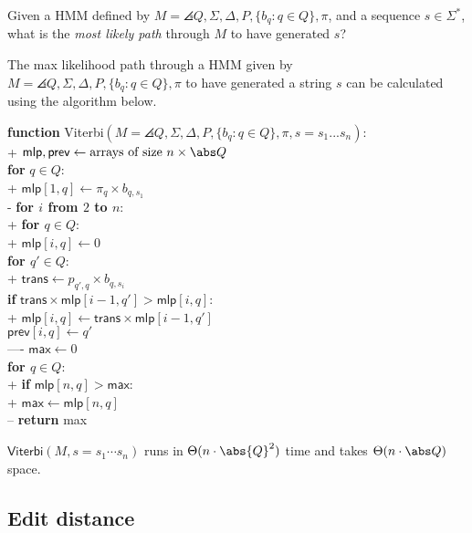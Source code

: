 \documentclass{article}
\begin{document}
\begin{definition}
	Given a HMM defined by $M=\angles{Q,\Sigma,\Delta,P,\{b_q:q\in Q\},\pi}$, and
	a sequence $s\in\Sigma^*$, what is the \emph{most likely path} through $M$
	to have generated $s$?
\end{definition}

\begin{theorem}[L19]
	The max likelihood path through a HMM given by $M=\angles{Q,\Sigma,\Delta,
			P,\{b_q:q\in Q\},\pi}$ to have generated a string $s$ can be calculated
	using the algorithm below.
	\begin{pseudo}
		\textbf{function} \textsf{Viterbi}$(M=\angles{Q,\Sigma,\Delta, P,
				\{b_q:q\in Q\},\pi}, s=s_1...s_n)$:									\\+
		$\textsf{mlp}, \textsf{prev}
			\leftarrow \text{arrays of size $n\times\abs Q$}$				\\
		\textbf{for} $q\in Q$:												\\+
		$\textsf{mlp}[1,q]\leftarrow\pi_q\times b_{q,s_1}$				\\-
		\textbf{for $i$ from $2$ to $n$}:									\\+
		\textbf{for $q\in Q$}:											\\+
		$\textsf{mlp}[i,q]\leftarrow 0$								\\
		\textbf{for $q'\in Q$}:										\\+
		$\textsf{trans}\leftarrow p_{q',q}\times b_{q,s_i}$	\\
		\textbf{if} $\textsf{trans}\times\textsf{mlp}[i-1,q']>
			\textsf{mlp}[i,q]$:									\\+
		$\textsf{mlp}[i,q]\leftarrow
			\textsf{trans}\times\textsf{mlp}[i-1,q']$		\\
		$\textsf{prev}[i,q]\leftarrow q'$					\\----
		$\textsf{max}\leftarrow 0$											\\
		\textbf{for $q\in Q$}:												\\+
		\textbf{if} $\textsf{mlp}[n,q]>\textsf{max}$:					\\+
		$\textsf{max}\leftarrow\textsf{mlp}[n,q]$					\\--
		\textbf{return} \textsf{max}
	\end{pseudo}
	$\textsf{Viterbi}(M, s=s_1\cdots s_n)$ runs in $\Theta(n\cdot\abs{Q}^2)$ time
	and takes $\Theta(n\cdot\abs Q)$ space.
\end{theorem}

\subsection{Edit distance}
\end{document}
